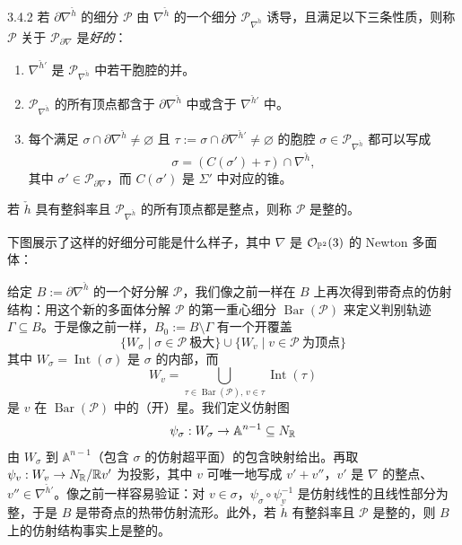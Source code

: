 \begin{definition}{3.4.2}
若 $\partial\nabla^{\check h}$ 的细分 $\mathcal{P}$ 由 $\nabla^{\check h}$ 的一个细分 $\mathcal{P}_{\nabla^{\check h}}$ 诱导，且满足以下三条性质，则称 $\mathcal{P}$ 关于 $\mathcal{P}_{\partial\nabla}$ 是\emph{好的}：
\begin{enumerate}
\item $\nabla^{\check h'}$ 是 $\mathcal{P}_{\nabla^{\check h}}$ 中若干胞腔的并。
\item $\mathcal{P}_{\nabla^{\check h}}$ 的所有顶点都含于 $\partial\nabla^{\check h}$ 中或含于 $\nabla^{\check h'}$ 中。
\item 每个满足 $\sigma\cap\partial\nabla^{\check h}\ne\varnothing$ 且 $\tau:=\sigma\cap\partial\nabla^{\check h'}\ne\varnothing$ 的胞腔 $\sigma\in\mathcal{P}_{\nabla^{\check h}}$ 都可以写成
\[
\sigma=(C(\sigma')+\tau)\cap\nabla^{\check h},
\]
其中 $\sigma'\in\mathcal{P}_{\partial\nabla}$，而 $C(\sigma')$ 是 $\Sigma'$ 中对应的锥。
\end{enumerate}
若 $\check h$ 具有整斜率且 $\mathcal{P}_{\nabla^{\check h}}$ 的所有顶点都是整点，则称 $\mathcal{P}$ 是整的。
\end{definition}

下图展示了这样的好细分可能是什么样子，其中 $\nabla$ 是 $\mathcal{O}_{\mathbb{P}^2}(3)$ 的 Newton 多面体：




给定 $B:=\partial\nabla^{\check h}$ 的一个好分解 $\mathcal{P}$，我们像之前一样在 $B$ 上再次得到带奇点的仿射结构：用这个新的多面体分解 $\mathcal{P}$ 的第一重心细分 $\operatorname{Bar}(\mathcal{P})$ 来定义判别轨迹 $\Gamma\subseteq B$。于是像之前一样，$B_0:=B\setminus\Gamma$ 有一个开覆盖
\[
\{W_\sigma \mid \sigma\in\mathcal{P}\ \text{极大}\}\cup\{W_v \mid v\in\mathcal{P}\ \text{为顶点}\}
\]
其中 $W_\sigma=\operatorname{Int}(\sigma)$ 是 $\sigma$ 的内部，而
\[
W_v=\bigcup_{\tau\in\operatorname{Bar}(\mathcal{P}),\,v\in\tau}\operatorname{Int}(\tau)
\]
是 $v$ 在 $\operatorname{Bar}(\mathcal{P})$ 中的（开）星。我们定义仿射图
\[
\psi_\sigma: W_\sigma\to\mathbb{A}^{n-1}\subseteq N_{\mathbb{R}}
\]
由 $W_\sigma$ 到 $\mathbb{A}^{n-1}$（包含 $\sigma$ 的仿射超平面）的包含映射给出。再取 $\psi_v: W_v\to N_{\mathbb{R}}/\mathbb{R} v'$ 为投影，其中 $v$ 可唯一地写成 $v'+v''$，$v'$ 是 $\nabla$ 的整点、$v''\in\nabla^{\check h'}$。像之前一样容易验证：对 $v\in\sigma$，$\psi_\sigma\circ\psi_v^{-1}$ 是仿射线性的且线性部分为整，于是 $B$ 是带奇点的热带仿射流形。此外，若 $\check h$ 有整斜率且 $\mathcal{P}$ 是整的，则 $B$ 上的仿射结构事实上是整的。

